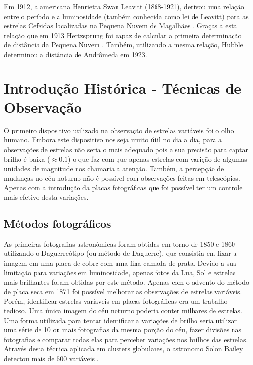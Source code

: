 Em 1912, a americana Henrietta Swan Leavitt (1868-1921), derivou uma relação entre o período e a luminosidade (também conhecida como lei de Leavitt) para as estrelas Cefeidas localizadas na Pequena Nuvem de Magalhães \citep{Leavitt1912}. Graças a esta relação que em 1913 Hertzsprung foi capaz de calcular a primeira determinação de distância da Pequena Nuvem \citep{Hertzsprung1913}. Também, utilizando a mesma relação, Hubble determinou a distância de Andrômeda em 1923.


\section{Introdução Histórica - Técnicas de Observação}

O primeiro dispositivo utilizado na observação de estrelas variáveis foi o olho humano. 
Embora este dispositivo nos seja muito útil no dia a dia, para a observações de estrelas não seria o mais adequado pois a sua precisão para captar brilho é baixa ($\approx 0.1$) o que faz com que apenas estrelas com varição de algumas unidades de magnitude nos chamaria a atenção. Também, a percepção de mudanças no céu noturno não é possível com observações feitas em telescópios. Apenas com a introdução da placas fotográficas que foi possível ter um controle mais efetivo desta variações. 

\subsection{Métodos fotográficos}

As primeiras fotografias astronômicas foram obtidas em torno de 1850 e 1860 utilizando o Daguerreótipo (ou método de Daguerre), que consistia em fixar a imagem em uma placa de cobre com uma fina camada de prata. Devido a sua limitação para variações em luminosidade, apenas fotos da Lua, Sol e estrelas mais brilhantes foram obtidas por este método. Apenas com o advento do método de placa seca em 1871 foi possível melhorar as observações de estrelas variáveis. Porém, identificar estrelas variáveis em placas fotográficas era um trabalho tedioso. Uma única imagem do céu noturno poderia conter milhares de estrelas. Uma forma utilizada para tentar identificar a variações de brilho seria utilizar uma série de 10 ou mais fotografias da mesma porção do céu, fazer divisões nas fotografias e comparar todas elas para perceber variações nos brilhos das estrelas. Através desta técnica aplicada em clusters globulares, o astronomo Solon Bailey detectou mais de 500 variáveis \citep{Bailey1902}.

